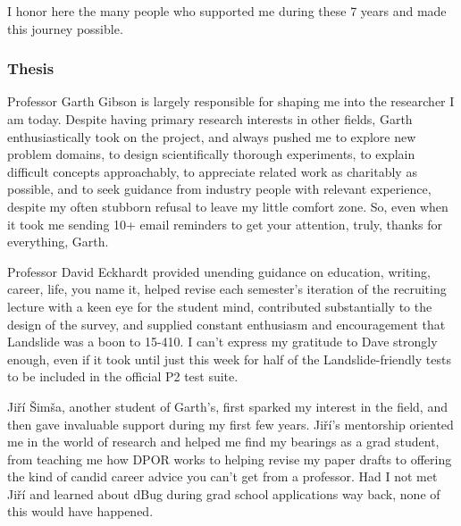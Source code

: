 \documentclass[12pt]{cmuthesis}
\begin{document}
\begin{acknowledgments}
I honor here the many people who supported me during these 7 years and made this journey possible.

\subsubsection{Thesis}

Professor Garth Gibson is largely responsible for shaping me into the researcher I am today.
Despite having primary research interests in other fields,
Garth enthusiastically took on the project,
and always pushed me to explore new problem domains,
to design scientifically thorough experiments,
to explain difficult concepts approachably,
to appreciate related work as charitably as possible,
and to seek guidance from industry people with relevant experience,
despite my often stubborn refusal to leave my little comfort zone.
So, even when it took me sending 10+ email reminders to get your attention,
truly,
thanks for everything, Garth.

Professor David Eckhardt
provided unending guidance on education, writing, career, life, you name it,
helped revise each semester's iteration of the recruiting lecture with a keen eye for the student mind,
contributed substantially to the design of the survey,
and supplied constant enthusiasm and encouragement that Landslide was a boon to 15-410.
I can't express my gratitude to Dave strongly enough,
even if it took until just this week for half of the Landslide-friendly tests to be included in the official P2 test suite.

Ji\v{r}\'{i} \v{S}im\v{s}a, another student of Garth's,
first sparked my interest in the field,
and then gave invaluable support during my first few years.
Ji\v{r}\'{i}'s mentorship
oriented me in the world of research and helped me find my bearings as a grad student,
from teaching me how DPOR works
to helping revise my paper drafts
to offering the kind of candid career advice you can't get from a professor.
Had I not met Ji\v{r}\'{i} and learned about dBug during grad school applications way back,
none of this would have happened.


\end{acknowledgments}
\end{document}
